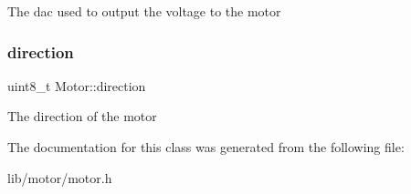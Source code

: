 The dac used to output the voltage to the motor \hypertarget{class_motor_a717a5684a774d01f46c8ae7145158279}{}\label{class_motor_a717a5684a774d01f46c8ae7145158279} 
\subsubsection{\texorpdfstring{direction}{direction}}
{\footnotesize\ttfamily uint8\+\_\+t Motor\+::direction\hspace{0.3cm}{\ttfamily [private]}}

The direction of the motor 

The documentation for this class was generated from the following file\+:\begin{DoxyCompactItemize}
\item 
lib/motor/motor.\+h\end{DoxyCompactItemize}
